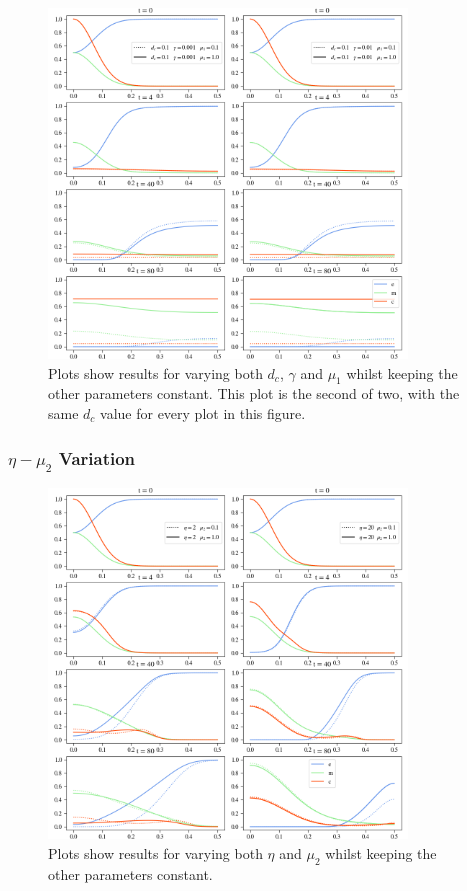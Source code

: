 \begin{figure}[h]
    \centering
    \includegraphics[width=0.85\textwidth]{resources/images/prolif_dc_gamma_mu1_2.png}
    \caption{Plots show results for varying both $d_c$, $\gamma$ and $\mu_1$ whilst keeping the other parameters constant. This plot is the second of two, with the same $d_c$ value for every plot in this figure.}
    \label{fig:prolif_dc_gamma_mu_1_variation_2}
\end{figure}

\subsubsection*{$\eta -\mu_2$ Variation}
\begin{figure}[h]
    \centering
    \includegraphics[width=0.85\textwidth]{resources/images/prolif_eta_mu2_variation.png}
    \caption{Plots show results for varying both $\eta$ and $\mu_2$ whilst keeping the other parameters constant.}
    \label{fig:prolif_eta_mu_2_variation}
\end{figure}

